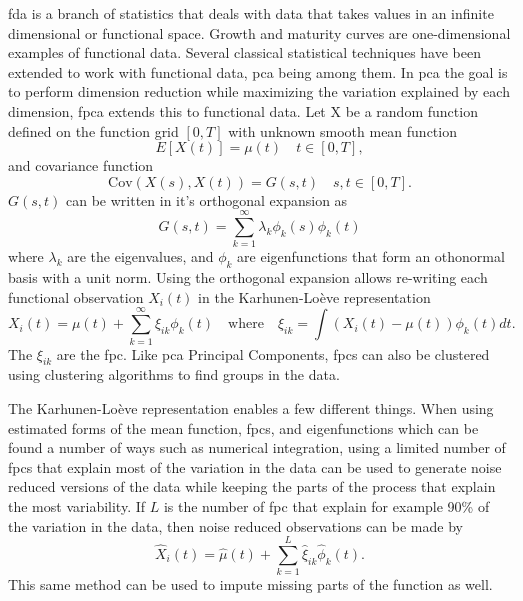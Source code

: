 \documentclass[11pt]{article}\usepackage[]{graphicx}\usepackage[]{color}
\begin{document}
\begin{appendices}
\acrfull{fda} is a branch of statistics that deals with data that takes values in an infinite dimensional or functional space. Growth and maturity curves are one-dimensional examples of functional data. Several classical statistical techniques have been extended to work with functional data, \acrfull{pca} being among them. In \acrfull{pca} the goal is to perform dimension reduction while maximizing the variation explained by each dimension, \acrfull{fpca} extends this to functional data. Let X be a random function defined on the function grid $[0,T]$ with unknown smooth mean function
\begin{equation}
E[X(t)] = \mu(t) \quad t \in [0,T],	
\end{equation}
and covariance function
\begin{equation}
\text{Cov}(X(s),X(t)) = G(s,t) \quad s,t \in [0,T].	
\end{equation}
$G(s,t)$ can be written in it's orthogonal expansion as
\begin{equation}
	G(s,t) = \sum_{k=1}^{\infty} \lambda_k \phi_k(s)\phi_k(t)
\end{equation}
 where $\lambda_k$ are the eigenvalues, and $\phi_k$ are eigenfunctions that form an othonormal basis with a unit norm. Using the orthogonal expansion allows re-writing each functional observation $X_i(t)$ in the Karhunen-Lo\`eve representation
 \begin{equation}
 X_i(t) = \mu(t) + \sum_{k=1}^{\infty} \xi_{ik}\phi_k(t) \quad \text{where} \quad \xi_{ik}= \int(X_i(t)-\mu(t))\phi_k(t)dt.
 \end{equation}
 The $\xi_{ik}$ are the \acrfull{fpc}\cite{Chiou_2014}. Like \acrshort{pca} Principal Components, \acrshort{fpc}s can also be clustered using clustering algorithms to find groups in the data. 
 
 The Karhunen-Lo\`eve representation enables a few different things. When using estimated forms of the mean function, \acrshort{fpc}s, and eigenfunctions which can be found a number of ways such as numerical integration, using a limited number of \acrshort{fpc}s that explain most of the variation in the data can be used to generate noise reduced versions of the data while keeping the parts of the process that explain the most variability\cite{ramsay2007applied}. If $L$ is the number of \acrshort{fpc} that explain for example 90\% of the variation in the data, then noise reduced observations can be made by
 \begin{equation}
 	\hat{X}_i(t) = \hat{\mu}(t) + \sum_{k=1}^{L} \hat{\xi}_{ik}\hat{\phi}_k(t).
 \end{equation}
 This same method can be used to impute missing parts of the function as well\cite{Chiou_2014}.


\end{appendices}


\printbibliography
\end{document}

